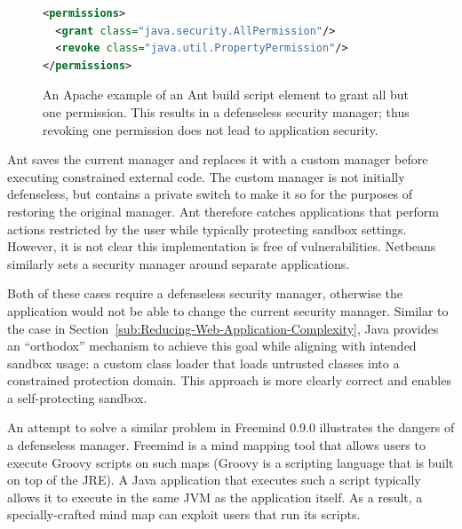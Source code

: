 \documentclass{sig-alternate-05-2015}
\begin{document}
\begin{figure}
\begin{lstlisting}[language=XML,basicstyle={\scriptsize}]
<permissions>   
  <grant class="java.security.AllPermission"/>   
  <revoke class="java.util.PropertyPermission"/> 
</permissions>
\end{lstlisting}

\caption{An Apache example of an Ant build script element to grant all but
  one permission. This results in a defenseless security manager;
\label{fig:Ant Permissions Example} 
  thus revoking one permission does not lead to application security.}
\end{figure}

Ant saves the current manager and replaces it with a custom manager before
executing constrained external code.  The custom
manager is not initially defenseless, but
contains a private switch to make it so for the purposes of
restoring the original manager.  Ant therefore catches 
applications that perform actions restricted by the user while typically
protecting sandbox settings. However, it is not clear this implementation is
free of vulnerabilities. Netbeans similarly sets a security manager around 
separate applications.

Both of these cases require a defenseless security manager, otherwise
the application would not be able to change the current security manager. 
Similar to the case in Section~\ref{sub:Reducing-Web-Application-Complexity},
Java provides an ``orthodox'' mechanism to achieve this goal while aligning with
intended sandbox usage: a custom class
loader that loads untrusted classes into a constrained protection
domain.  %
This approach is more clearly correct and enables a self-protecting sandbox.

An attempt to solve a similar problem in Freemind 0.9.0 illustrates
the dangers of a defenseless manager. Freemind is a mind mapping tool that
allows users to execute
Groovy scripts on such maps (Groovy is a scripting
language that is built on top of the JRE).  A Java application that
executes such a script typically allows it to execute in the same
JVM as the application itself. As a result, a specially-crafted mind map can
exploit users that run its scripts.
\end{document}

